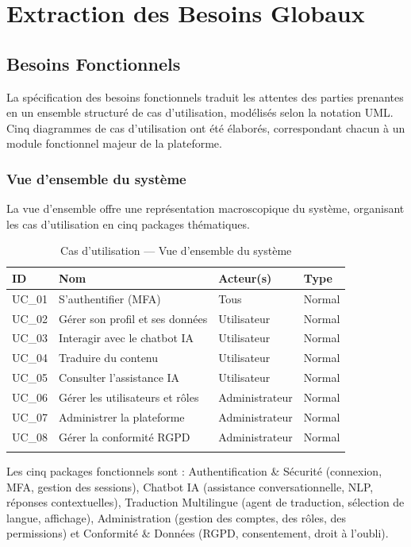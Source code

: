 \section{Extraction des Besoins Globaux}

\subsection{Besoins Fonctionnels}
La spécification des besoins fonctionnels traduit les attentes des parties prenantes en un ensemble structuré de cas d'utilisation, modélisés selon la notation UML. Cinq diagrammes de cas d'utilisation ont été élaborés, correspondant chacun à un module fonctionnel majeur de la plateforme.

\subsubsection{Vue d'ensemble du système}
La vue d'ensemble offre une représentation macroscopique du système, organisant les cas d'utilisation en cinq packages thématiques.

\begin{longtable}{|m{1.5cm}|m{5cm}|m{3cm}|m{2.5cm}|}
\hline
\textbf{ID} & \textbf{Nom} & \textbf{Acteur(s)} & \textbf{Type} \\
\hline
\endhead
\endfoot
\endlastfoot
\hline
UC\_01 & S'authentifier (MFA) & Tous & Normal \\
\hline
UC\_02 & Gérer son profil et ses données & Utilisateur & Normal \\
\hline
UC\_03 & Interagir avec le chatbot IA & Utilisateur & Normal \\
\hline
UC\_04 & Traduire du contenu & Utilisateur & Normal \\
\hline
UC\_05 & Consulter l'assistance IA & Utilisateur & Normal \\
\hline
UC\_06 & Gérer les utilisateurs et rôles & Administrateur & Normal \\
\hline
UC\_07 & Administrer la plateforme & Administrateur & Normal \\
\hline
UC\_08 & Gérer la conformité RGPD & Administrateur & Normal \\
\hline
\captionsetup{justification=centering,margin=2cm}
\caption{Cas d'utilisation — Vue d'ensemble du système}
\label{tab:uc_overview}
\end{longtable}

Les cinq packages fonctionnels sont : Authentification \& Sécurité (connexion, MFA, gestion des sessions), Chatbot IA (assistance conversationnelle, NLP, réponses contextuelles), Traduction Multilingue (agent de traduction, sélection de langue, affichage), Administration (gestion des comptes, des rôles, des permissions) et Conformité \& Données (RGPD, consentement, droit à l'oubli).

